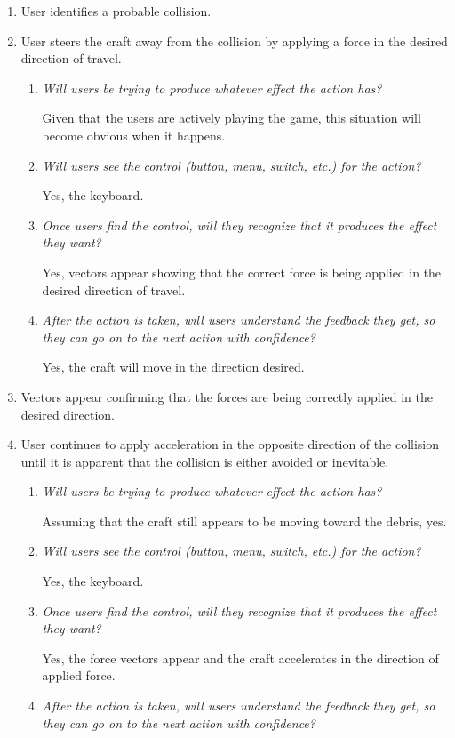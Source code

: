 \begin{enumerate}
\begin{enumerate}
  \item User identifies a probable collision.

  \item User steers the craft away from the collision by applying a force in the desired direction of travel.
  \begin{enumerate}
    \item \emph{Will users be trying to produce whatever effect the action has?}

    Given that the users are actively playing the game, this situation will become obvious when it happens.
    \item \emph{Will users see the control (button, menu, switch, etc.) for the action?}

    Yes, the keyboard.
    \item \emph{Once users find the control, will they recognize that it produces the effect they want?}

    Yes, vectors appear showing that the correct force is being applied in the desired direction of travel.
    \item \emph{After the action is taken, will users understand the feedback they get, so they can go on to the next action with confidence?}

    Yes, the craft will move in the direction desired.
  \end{enumerate}

  \item Vectors appear confirming that the forces are being correctly applied in the desired direction.

  \item User continues to apply acceleration in the opposite direction of the collision until it is apparent that the collision is either avoided or inevitable.
  \begin{enumerate}
    \item \emph{Will users be trying to produce whatever effect the action has?}

    Assuming that the craft still appears to be moving toward the debris, yes.
    \item \emph{Will users see the control (button, menu, switch, etc.) for the action?}

    Yes, the keyboard.
    \item \emph{Once users find the control, will they recognize that it produces the effect they want?}

    Yes, the force vectors appear and the craft accelerates in the direction of applied force.
    \item \emph{After the action is taken, will users understand the feedback they get, so they can go on to the next action with confidence?}


\end{enumerate}
\end{enumerate}
\end{enumerate}
